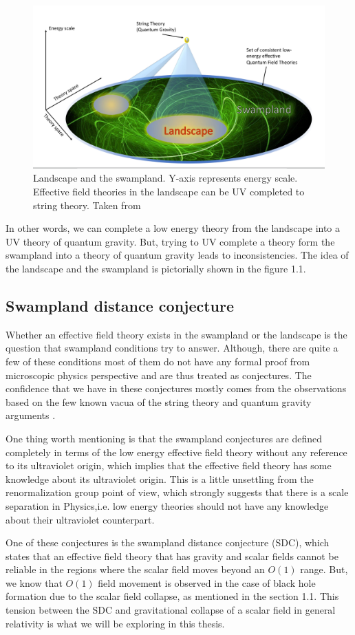 \begin{figure}[hbt!]
    \centering
    \includegraphics[width=\textwidth]{images/swampland.png}
    \caption{Landscape and the swampland. Y-axis represents energy scale. Effective field theories in the landscape can be UV completed to string theory. Taken from \citep{Palti:2019pca}}
    \label{swampland and landscape}
\end{figure}

In other words, we can complete a low energy theory from the landscape into a UV theory of quantum gravity. But, trying to UV complete a theory form the swampland into a theory of quantum gravity leads to inconsistencies. The idea of the landscape and the swampland is pictorially shown in the figure 1.1.

\subsection{Swampland distance conjecture}
Whether an effective field theory exists in the swampland or the landscape is the question that swampland conditions try to answer. Although, there are quite a few of these conditions most of them do not have any formal proof from microscopic physics perspective and are thus treated as conjectures. The confidence that we have in these conjectures mostly comes from the observations based on the few known vacua of the string theory and quantum gravity arguments \citep{Palti:2019pca} \citep{Brennan:2017rbf}.


One thing worth mentioning is that the swampland conjectures are defined completely in terms of the low energy effective field theory without any reference to its ultraviolet origin, which implies that the effective field theory has some knowledge about its ultraviolet origin. This is a little unsettling from the renormalization group point of view, which strongly suggests that there is a scale separation in Physics,i.e. low energy theories should not have any knowledge about their ultraviolet counterpart.

One of these conjectures is the swampland distance conjecture (SDC), which states that an effective field theory that has gravity and scalar fields cannot be reliable in the regions where the scalar field moves beyond an $O(1)$ range.
But, we know that $O(1)$ field movement is observed in the case of black hole formation due to the scalar field collapse, as mentioned in the section 1.1. This tension between the SDC and gravitational collapse of a scalar field in general
relativity is what we will be exploring in this thesis.